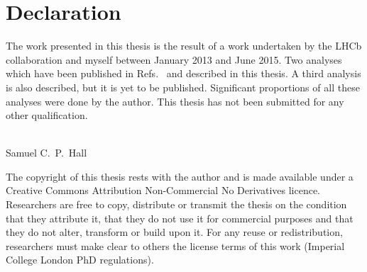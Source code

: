 \clearpage
\chapter*{\centering Declaration}

\begin{center}
  {\setlength{\currentparskip}{\parskip}%
  \begin{minipage}{0.8\textwidth}
    \setlength{\parskip}{\currentparskip}%
    The work presented in this thesis is the result of a work undertaken by the
    LHCb collaboration and myself between January 2013 and June 2015.
    Two analyses which have been
    published in Refs.~\cite{LHCb-PAPER-2012-025,LHCb-PAPER-2014-030} and described in this thesis.
    A third analysis is also described, but it is yet to be published.
    Significant proportions of all these analyses were done by the author.
    This thesis has not been submitted for any other qualification.
    \\\\
    \begin{flushright}
      Samuel C.~P.~Hall\\
      \shortdate
    \end{flushright}
  \end{minipage}

    \vfill

  \begin{minipage}{0.8\textwidth}
    \footnotesize
    The copyright of this thesis rests with the author and is made available under a Creative
    Commons Attribution Non-Commercial No Derivatives licence. Researchers are free to copy,
    distribute or transmit the thesis on the condition that they attribute it, that they do not use
    it for commercial purposes and that they do not alter, transform or build upon it. For any
    reuse or redistribution, researchers must make clear to others the license terms of this work
    (Imperial College London PhD regulations).
  \end{minipage}}
  \vspace{1.0cm}
\end{center}
